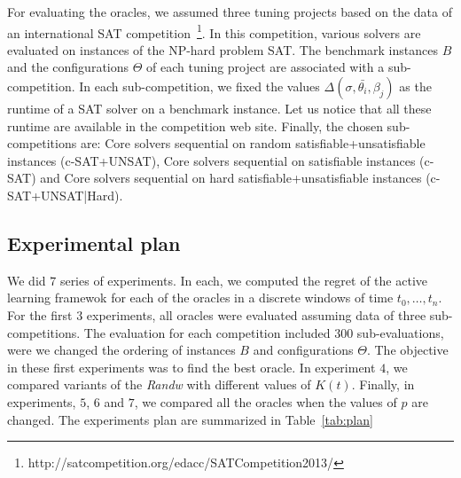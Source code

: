 \documentclass[10pt, conference, compsocconf]{IEEEtran}
\begin{document}
For evaluating the oracles, we assumed three tuning projects based on the data of an international SAT 
competition~\footnote{http://satcompetition.org/edacc/SATCompetition2013/}. In this competition, various 
solvers are evaluated on instances of the NP-hard problem SAT. The benchmark 
instances $B$ and the configurations $\Theta$ of each tuning project are associated 
with a sub-competition. In each sub-competition, we fixed the values $\Delta(\sigma, \bar{\theta_i}, \beta_j)$ as the 
runtime of a SAT solver on a benchmark instance. Let us notice that all these runtime are available 
in the competition web site. Finally, the chosen sub-competitions are: Core solvers sequential on random satisfiable+unsatisfiable instances (c-SAT+UNSAT), Core solvers sequential on satisfiable instances (c-SAT) and  Core solvers sequential on hard satisfiable+unsatisfiable instances (c-SAT+UNSAT|Hard). 

\subsection{Experimental plan}

We did $7$ series of experiments. In each, we computed the regret of the active learning framewok for each 
of the oracles in a discrete windows of time $t_0,\dots ,t_n$. 
For the first $3$ experiments, all oracles were evaluated assuming data of three sub-competitions. The 
evaluation for each competition included $300$ sub-evaluations, were we changed the ordering of instances $B$ and 
configurations $\Theta$.  The objective in these first experiments was to find the best oracle. In experiment $4$, we 
compared variants of the {\it Randw} with different values of  $K(t)$. Finally, in experiments, 
$5$, $6$ and $7$, we compared all the oracles when the values of $p$ are changed. The experiments plan 
are summarized in Table~\ref{tab:plan}
\end{document}
